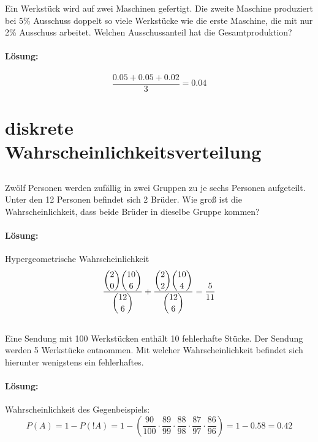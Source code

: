 \documentclass[ngerman]{scrartcl}
\begin{document}
Ein Werkstück wird auf zwei Maschinen gefertigt. Die zweite Maschine produziert bei 5\% Ausschuss doppelt so viele Werkstücke wie die erste Maschine, die mit nur 2\% Ausschuss arbeitet. Welchen Ausschussanteil hat die Gesamtproduktion?

\paragraph{Lösung:}
\begin{equation}
\frac{0.05 + 0.05 + 0.02}{3} = 0.04
\end{equation}

\section{diskrete Wahrscheinlichkeitsverteilung}

\subsection{}
Zwölf Personen werden zufällig in zwei Gruppen zu je sechs Personen aufgeteilt. Unter den 12 Personen befindet sich 2 Brüder. Wie groß ist die Wahrscheinlichkeit, dass beide Brüder in dieselbe Gruppe kommen?
\paragraph{Lösung:}
Hypergeometrische Wahrscheinlichkeit
\begin{equation}
\frac{\dbinom{2}{0}\dbinom{10}{6}}{\dbinom{12}{6}} +
\frac{\dbinom{2}{2}\dbinom{10}{4}}{\dbinom{12}{6}} = \frac{5}{11}
\end{equation}

\subsection{}
Eine Sendung mit 100 Werkstücken enthält 10 fehlerhafte Stücke. Der Sendung werden 5 Werkstücke entnommen. Mit welcher Wahrscheinlichkeit befindet sich hierunter wenigstens ein fehlerhaftes. 
\paragraph{Lösung:}
Wahrscheinlichkeit des Gegenbeispiels:
\begin{equation}
P(A) = 1 - P(!A) = 1 - \left(\frac{90}{100} \cdot \frac{89}{99} \cdot \frac{88}{98} \cdot \frac{87}{97} \cdot \frac{86}{96}\right) = 1 - 0.58 = 0.42
\end{equation}
\end{document}
